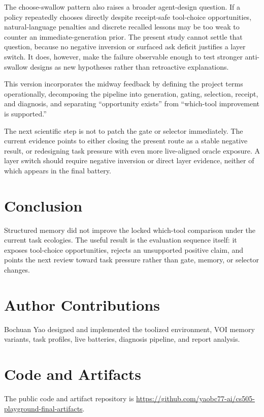 \documentclass[11pt]{article}
\begin{document}
The choose-swallow pattern also raises a broader agent-design question. If a policy repeatedly chooses directly despite receipt-safe tool-choice opportunities, natural-language penalties and discrete recalled lessons may be too weak to counter an immediate-generation prior. The present study cannot settle that question, because no negative inversion or surfaced ask deficit justifies a layer switch. It does, however, make the failure observable enough to test stronger anti-swallow designs as new hypotheses rather than retroactive explanations.

This version incorporates the midway feedback by defining the project terms operationally, decomposing the pipeline into generation, gating, selection, receipt, and diagnosis, and separating ``opportunity exists'' from ``which-tool improvement is supported.''

The next scientific step is not to patch the gate or selector immediately. The current evidence points to either closing the present route as a stable negative result, or redesigning task pressure with even more live-aligned oracle exposure. A layer switch should require negative inversion or direct layer evidence, neither of which appears in the final battery.

\section{Conclusion}

Structured memory did not improve the locked which-tool comparison under the current task ecologies. The useful result is the evaluation sequence itself: it exposes tool-choice opportunities, rejects an unsupported positive claim, and points the next review toward task pressure rather than gate, memory, or selector changes.

\section*{Author Contributions}

Bochuan Yao designed and implemented the toolized environment, VOI memory variants, task profiles, live batteries, diagnosis pipeline, and report analysis.

\section*{Code and Artifacts}

The public code and artifact repository is \url{https://github.com/yaobc77-ai/cs505-playground-final-artifacts}.


\end{document}
